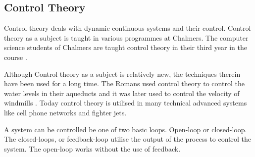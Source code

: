 \subsection{Control Theory}
Control theory deals with dynamic continuous systems and their control. Control theory as a subject is taught in various programmes at Chalmers. The computer science students of Chalmers are taught control theory in their third year in the course .

Although Control theory as a subject is relatively new, the techniques therein have been used for a long time. The Romans used control theory to control the water levels in their aqueducts and it was later used to control the velocity of windmills \cite{ControlTheoryHistory}. Today control theory is utilised in many technical advanced systems like cell phone networks and fighter jets.

A system can be controlled be one of two basic loops. Open-loop or closed-loop. The closed-loops, or feedback-loop utilise the output of the process to control the system. The open-loop works without the use of feedback.
